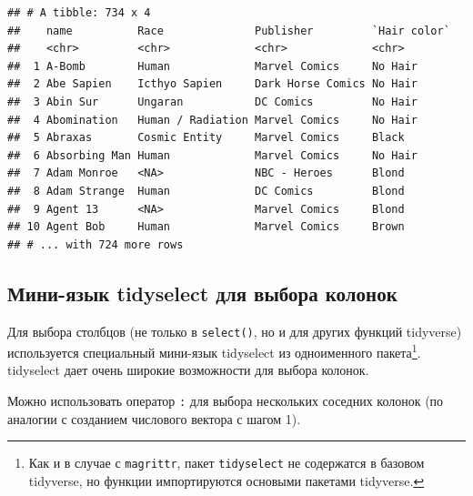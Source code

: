 \documentclass[
]{book}
\newenvironment{Shaded}{\begin{snugshade}}{\end{snugshade}}
\newcommand{\DataTypeTok}[1]{\textcolor[rgb]{0.13,0.29,0.53}{#1}}
\newcommand{\KeywordTok}[1]{\textcolor[rgb]{0.13,0.29,0.53}{\textbf{#1}}}
\newcommand{\NormalTok}[1]{#1}
\newcommand{\OperatorTok}[1]{\textcolor[rgb]{0.81,0.36,0.00}{\textbf{#1}}}
\newcommand{\StringTok}[1]{\textcolor[rgb]{0.31,0.60,0.02}{#1}}
\begin{document}
\begin{Shaded}
\end{Shaded}

\begin{verbatim}
## # A tibble: 734 x 4
##    name          Race              Publisher         `Hair color`
##    <chr>         <chr>             <chr>             <chr>       
##  1 A-Bomb        Human             Marvel Comics     No Hair     
##  2 Abe Sapien    Icthyo Sapien     Dark Horse Comics No Hair     
##  3 Abin Sur      Ungaran           DC Comics         No Hair     
##  4 Abomination   Human / Radiation Marvel Comics     No Hair     
##  5 Abraxas       Cosmic Entity     Marvel Comics     Black       
##  6 Absorbing Man Human             Marvel Comics     No Hair     
##  7 Adam Monroe   <NA>              NBC - Heroes      Blond       
##  8 Adam Strange  Human             DC Comics         Blond       
##  9 Agent 13      <NA>              Marvel Comics     Blond       
## 10 Agent Bob     Human             Marvel Comics     Brown       
## # ... with 724 more rows
\end{verbatim}

\hypertarget{tidyselect}{%
\subsection{Мини-язык tidyselect для выбора колонок}\label{tidyselect}}

Для выбора столбцов (не только в \texttt{select()}, но и для других функций tidyverse) используется специальный мини-язык tidyselect из одноименного пакета\footnote{Как и в случае с \texttt{magrittr}, пакет \texttt{tidyselect} не содержатся в базовом tidyverse, но функции импортируются основыми пакетами tidyverse.}. tidyselect дает очень широкие возможности для выбора колонок.

Можно использовать оператор \texttt{:} для выбора нескольких соседних колонок (по аналогии с созданием числового вектора с шагом 1).

\begin{Shaded}
\end{Shaded}
\end{document}
